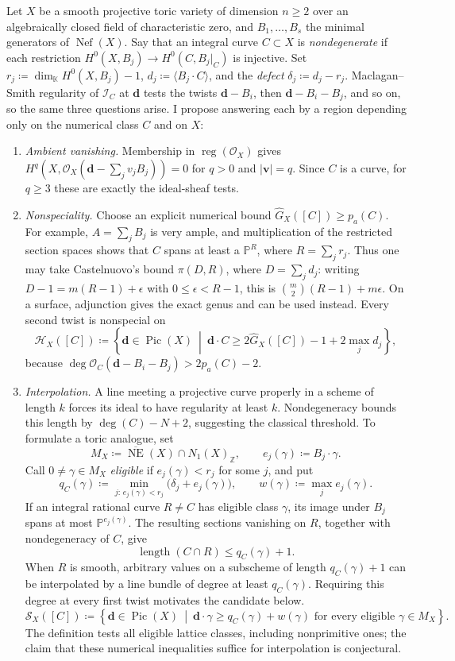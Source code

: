 \documentclass[11pt,reqno]{amsart}
\theoremstyle{remark}
\newcommand{\reg}{\operatorname{reg}}
\newcommand{\length}{\operatorname{length}}
\newcommand{\Pic}{\operatorname{Pic}}
\newcommand{\Nef}{\operatorname{Nef}}
\newcommand{\dd}{\mathbf{d}}
\newcommand{\vv}{\mathbf{v}}
\newcommand{\KK}{\mathbb{K}}
\newcommand{\PP}{\mathbb{P}}
\newcommand{\ZZ}{\mathbb{Z}}
\newcommand{\cH}{\mathcal{H}}
\newcommand{\cI}{\mathcal{I}}
\newcommand{\cO}{\mathcal{O}}
\newcommand{\cS}{\mathcal{S}}
\begin{document}
Let $X$ be a smooth projective toric variety of dimension $n\geq2$ over an algebraically closed field of characteristic zero, and $B_1,\ldots,B_s$ the minimal generators of $\Nef(X)$. Say that an integral curve $C\subset X$ is \emph{nondegenerate} if each restriction $H^0(X,B_j)\to H^0(C,B_j|_C)$ is injective. Set $r_j\coloneqq\dim_\KK H^0(X,B_j)-1$, $d_j\coloneqq\langle B_j\cdot C\rangle$, and the \emph{defect} $\delta_j\coloneqq d_j-r_j$. Maclagan--Smith regularity of $\cI_C$ at $\dd$ tests the twists $\dd-B_i$, then $\dd-B_i-B_j$, and so on, so the same three questions arise. I propose answering each by a region depending only on the numerical class $C$ and on $X$:
\begin{enumerate}
\item \emph{Ambient vanishing.} Membership in $\reg(\cO_X)$ gives $H^q(X,\cO_X(\dd-\sum_jv_jB_j))=0$ for $q>0$ and $|\vv|=q$. Since $C$ is a curve, for $q\geq3$ these are exactly the ideal-sheaf tests.

\item \emph{Nonspeciality.} Choose an explicit numerical bound $\widehat G_X([C])\geq p_a(C)$. For example, $A=\sum_jB_j$ is very ample, and multiplication of the restricted section spaces shows that $C$ spans at least a $\PP^R$, where $R=\sum_jr_j$. Thus one may take Castelnuovo's bound $\pi(D,R)$, where $D=\sum_jd_j$: writing $D-1=m(R-1)+\epsilon$ with $0\leq\epsilon<R-1$, this is $\binom{m}{2}(R-1)+m\epsilon$. On a surface, adjunction gives the exact genus and can be used instead. Every second twist is nonspecial on
\[
\cH_X([C])\coloneqq
\left\{\dd\in\Pic(X)\ \middle|\
\dd\cdot C\geq2\widehat G_X([C])-1+2\max_jd_j\right\},
\]
because $\deg\cO_C(\dd-B_i-B_j)>2p_a(C)-2$.

\item \emph{Interpolation.} A line meeting a projective curve properly in a scheme of length $k$ forces its ideal to have regularity at least $k$. Nondegeneracy bounds this length by $\deg(C)-N+2$, suggesting the classical threshold. To formulate a toric analogue, set
\[
M_X\coloneqq\overline{\operatorname{NE}}(X)\cap N_1(X)_{\ZZ},
\qquad e_j(\gamma)\coloneqq B_j\cdot\gamma.
\]
Call $0\neq\gamma\in M_X$ \emph{eligible} if $e_j(\gamma)<r_j$ for some $j$, and put
\[
q_C(\gamma)\coloneqq\min_{j:\,e_j(\gamma)<r_j}
\bigl(\delta_j+e_j(\gamma)\bigr),
\qquad w(\gamma)\coloneqq\max_je_j(\gamma).
\]
If an integral rational curve $R\neq C$ has eligible class $\gamma$, its image under $B_j$ spans at most $\PP^{e_j(\gamma)}$. The resulting sections vanishing on $R$, together with nondegeneracy of $C$, give
\[
\length(C\cap R)\leq q_C(\gamma)+1.
\]
When $R$ is smooth, arbitrary values on a subscheme of length $q_C(\gamma)+1$ can be interpolated by a line bundle of degree at least $q_C(\gamma)$. Requiring this degree at every first twist motivates the candidate below.
\[
\cS_X([C])\coloneqq
\left\{\dd\in\Pic(X)\ \middle|\
\dd\cdot\gamma\geq q_C(\gamma)+w(\gamma)
\text{ for every eligible }\gamma\in M_X\right\}.
\]
The definition tests all eligible lattice classes, including nonprimitive ones; the claim that these numerical inequalities suffice for interpolation is conjectural.
\end{enumerate}
\end{document}
